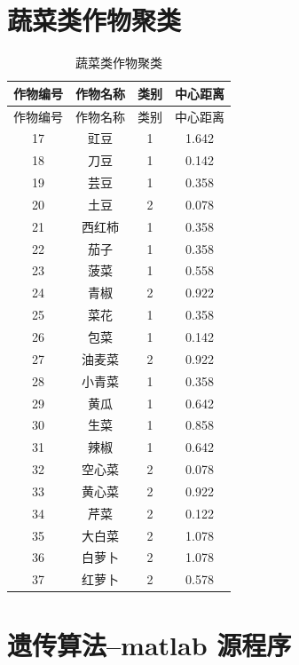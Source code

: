 \documentclass[withoutpreface,bwprint]{cumcmthesis} %
\begin{document}
\newpage
\begin{appendices}


\section{蔬菜类作物聚类}
\begin{longtable}{|c|c|c|c|}
	\caption{蔬菜类作物聚类}  \\
	\hline
	作物编号 & 作物名称 & 类别 & 中心距离  \\
	\hline
	\endfirsthead
	
	\hline
	作物编号 & 作物名称 & 类别 & 中心距离  \\
	\hline
	\endhead
	
	\hline
	\endfoot
	
	\hline
	\endlastfoot
	
	17 & 豇豆 & 1 & 1.642 \\
	18 & 刀豆 & 1 & 0.142 \\
	19 & 芸豆 & 1 & 0.358 \\
	20 & 土豆 & 2 & 0.078 \\
	21 & 西红柿 & 1 & 0.358 \\
	22 & 茄子 & 1 & 0.358 \\
	23 & 菠菜 & 1 & 0.558 \\
	24 & 青椒 & 2 & 0.922 \\
	25 & 菜花 & 1 & 0.358 \\
	26 & 包菜 & 1 & 0.142 \\
	27 & 油麦菜 & 2 & 0.922 \\
	28 & 小青菜 & 1 & 0.358 \\
	29 & 黄瓜 & 1 & 0.642 \\
	30 & 生菜 & 1 & 0.858 \\
	31 & 辣椒 & 1 & 0.642 \\
	32 & 空心菜 & 2 & 0.078 \\
	33 & 黄心菜 & 2 & 0.922 \\
	34 & 芹菜 & 2 & 0.122 \\
	35 & 大白菜 & 2 & 1.078 \\
	36 & 白萝卜 & 2 & 1.078 \\
	37 & 红萝卜 & 2 & 0.578 \\
\end{longtable}
\section{遗传算法--matlab 源程序}


\end{appendices}
\end{document}
